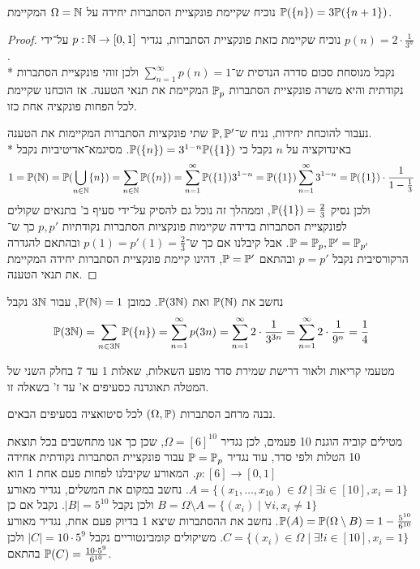 \Question{}
נוכיח שקיימת פונקציית הסתברות יחידה על $\Omega = \mathbb{N}$ המקיימת $\mathbb{P}(\{n\}) = 3 \mathbb{P}(\{n + 1\})$.
\begin{proof}
	נוכיח שקיימת כזאת פונקציית הסתברות, נגדיר $p : \mathbb{N} \to [0, 1]$ על־ידי $p(n) = 2 \cdot \frac{1}{3^n}$. \\*
	נקבל מנוסחת סכום סדרה הנדסית ש־$\sum_{n = 1}^{\infty} p(n) = 1$ ולכן זוהי פונקציית הסתברות נקודתית והיא משרה פונקציית הסתברות $\mathbb{P}_p$ המקיימת את תנאי הטענה.
	אז הוכחנו שקיימת לכל הפחות פונקציה אחת כזו.

	נעבור להוכחת יחידות, נניח ש־$\mathbb{P}, \mathbb{P}'$ שתי פונקציות הסתברות המקיימות את הטענה. \\*
	באינדוקציה על $n$ נקבל כי $\mathbb{P}(\{n\}) = 3^{1 - n} \mathbb{P}(\{1\})$.
	מסיגמא־אדיטיביות נקבל
	\[
		1
		= \mathbb{P}(\mathbb{N})
		= \mathbb{P}(\bigcup_{n \in \mathbb{N}} \{ n \})
		= \sum_{n \in \mathbb{N}} \mathbb{P}(\{ n \})
		= \sum_{n = 1}^{\infty} \mathbb{P}(\{1\}) 3^{1 - n}
		= \mathbb{P}(\{1\}) \sum_{n = 1}^{\infty} 3^{1 - n}
		= \mathbb{P}(\{1\}) \cdot \frac{1}{1 - \frac{1}{3}}
	\]
	ולכן נסיק $\mathbb{P}(\{1\}) = \frac{2}{3}$, וממהלך זה נוכל גם להסיק על־ידי סעיף ב' בתנאים שקולים לפונקציית הסתברות בדידה שקיימות פונקציות הסתברות נקודתיות $p, p'$ כך ש־$\mathbb{P} = \mathbb{P}_p, \mathbb{P}' = \mathbb{P}_{p'}$.
	אבל קיבלנו אם כך ש־$p(1) = p'(1) = \frac{2}{3}$ ובהתאם להגדרה הרקורסיבית נקבל $p = p'$ ובהתאם $\mathbb{P} = \mathbb{P}'$, דהינו קיימת פונקציית הסתברות יחידה המקיימת את תנאי הטענה.
\end{proof}
נחשב את $\mathbb{P}(\mathbb{N})$ ואת $\mathbb{P}(3\mathbb{N})$.
כמובן $\mathbb{P}(\mathbb{N}) = 1$, עבור $3\mathbb{N}$ נקבל
\[
	\mathbb{P}(3\mathbb{N}) 
	= \sum_{n \in 3\mathbb{N}} \mathbb{P}(\{n\}) 
	= \sum_{n = 1}^{\infty} p(3n) 
	= \sum_{n = 1}^{\infty} 2 \cdot \frac{1}{3^{3n}}
	= \sum_{n = 1}^{\infty} 2 \cdot \frac{1}{9^{n}}
	= \frac{1}{4}
\]

\Question{}
מטעמי קריאות ולאור דרישת שמירת סדר מופע השאלות, שאלות 1 עד 7 בחלק השני של המטלה תאוגדנה כסעיפים א' עד ז' בשאלה זו.

נבנה מרחב הסתברות $(\Omega, \mathbb{P})$ לכל סיטואציה בסעיפים הבאים.

\Subquestion{}
מטילים קוביה הוגנת 10 פעמים, לכן נגדיר $\Omega = {[6]}^{10}$, שכן כך אנו מתחשבים בכל תוצאת 10 הטלות ולפי סדר, עוד נגדיר $\mathbb{P} = \mathbb{P}_p$ עבור פונקציית הסתברות נקודתית אחידה $p : [6] \to [0, 1]$.
המאורע שקיבלנו לפחות פעם אחת 1 הוא $A = \{ (x_1, \dots, x_{10}) \in \Omega \mid \exists i \in [10], x_i = 1 \}$.
נחשב במקום את המשלים, נגדיר מאורע $B = \Omega \setminus A = \{ (x_i) \mid \forall i, x_i \ne 1 \}$ ולכן נקבל $|B| = 5^{10}$.
נקבל אם כן $\mathbb{P}(A) = \mathbb{P}(\Omega \setminus B) = 1 - \frac{5^{10}}{6^{10}}$.
נחשב את ההסתברות שיצא 1 בדיוק פעם אחת, נגדיר מאורע $C = \{ (x_i) \in \Omega \mid \exists ! i \in [10], x_i = 1 \}$.
משיקולים קומבינטוריים נקבל $|C| = 10 \cdot 5^9$ ולכן בהתאם $\mathbb{P}(C) = \frac{10 \cdot 5^9}{6^{10}}$.

